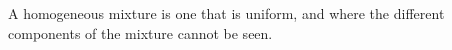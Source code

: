 \label{m38708*fhsst!!!underscore!!!id96} { \label{m38708*meaningfhsst!!!underscore!!!id96}
        A homogeneous mixture is one that is uniform, and where the different components of the mixture cannot be seen. 
         } 
\label{m38708*eip-479}
